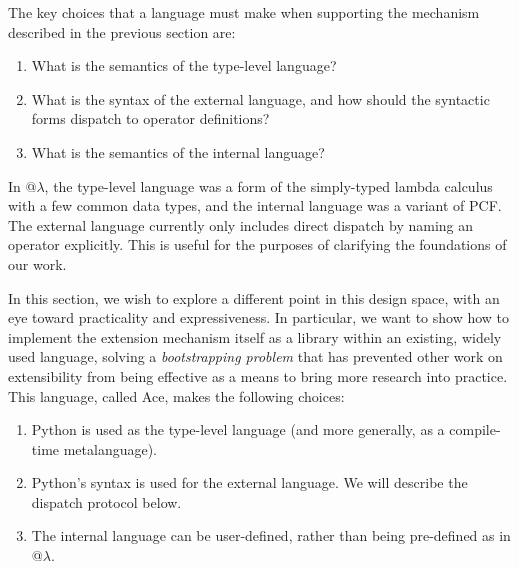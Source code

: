 



The key choices that a language must make when supporting the mechanism described in the previous section are:
\begin{enumerate}
\item What is the semantics of the type-level language?
\item What is the syntax of the external language, and how should the syntactic forms dispatch to  operator definitions?
\item What is the semantics of the internal language?
\end{enumerate}

In @$\lambda$, the type-level language was a form of the simply-typed lambda calculus with a few common data types, and the internal language was a variant of PCF. The external language currently only includes direct dispatch by naming an operator explicitly. This is useful for the purposes of clarifying the foundations of our work.

In this section, we wish to explore a different point in this design space, with an eye toward practicality and expressiveness. In particular, we want to show how to implement {the extension mechanism itself} as a library within an existing, widely used language, solving a \emph{bootstrapping problem} that has prevented  other work on extensibility from being effective as a means to bring more research into practice. This language, called Ace, makes the following choices:

\begin{enumerate}
\item Python is used as the type-level language (and more generally, as a compile-time metalanguage).
\item Python's syntax is used for the external language. We will describe the dispatch protocol below.
\item The internal language can be user-defined, rather than being pre-defined as in @$\lambda$.
\end{enumerate}

